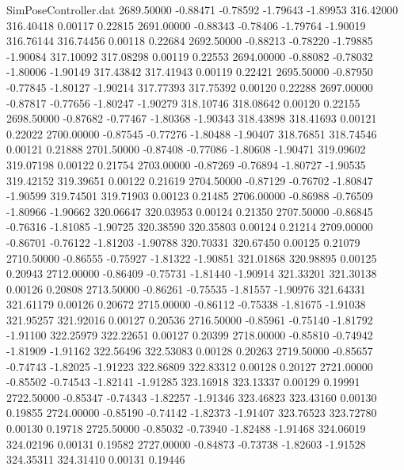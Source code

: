 \begin{filecontents}{SimPoseController.dat}
2689.50000   -0.88471   -0.78592    -1.79643   -1.89953  316.42000  316.40418    0.00117    0.22815
2691.00000   -0.88343   -0.78406    -1.79764   -1.90019  316.76144  316.74456    0.00118    0.22684
2692.50000   -0.88213   -0.78220    -1.79885   -1.90084  317.10092  317.08298    0.00119    0.22553
2694.00000   -0.88082   -0.78032    -1.80006   -1.90149  317.43842  317.41943    0.00119    0.22421
2695.50000   -0.87950   -0.77845    -1.80127   -1.90214  317.77393  317.75392    0.00120    0.22288
2697.00000   -0.87817   -0.77656    -1.80247   -1.90279  318.10746  318.08642    0.00120    0.22155
2698.50000   -0.87682   -0.77467    -1.80368   -1.90343  318.43898  318.41693    0.00121    0.22022
2700.00000   -0.87545   -0.77276    -1.80488   -1.90407  318.76851  318.74546    0.00121    0.21888
2701.50000   -0.87408   -0.77086    -1.80608   -1.90471  319.09602  319.07198    0.00122    0.21754
2703.00000   -0.87269   -0.76894    -1.80727   -1.90535  319.42152  319.39651    0.00122    0.21619
2704.50000   -0.87129   -0.76702    -1.80847   -1.90599  319.74501  319.71903    0.00123    0.21485
2706.00000   -0.86988   -0.76509    -1.80966   -1.90662  320.06647  320.03953    0.00124    0.21350
2707.50000   -0.86845   -0.76316    -1.81085   -1.90725  320.38590  320.35803    0.00124    0.21214
2709.00000   -0.86701   -0.76122    -1.81203   -1.90788  320.70331  320.67450    0.00125    0.21079
2710.50000   -0.86555   -0.75927    -1.81322   -1.90851  321.01868  320.98895    0.00125    0.20943
2712.00000   -0.86409   -0.75731    -1.81440   -1.90914  321.33201  321.30138    0.00126    0.20808
2713.50000   -0.86261   -0.75535    -1.81557   -1.90976  321.64331  321.61179    0.00126    0.20672
2715.00000   -0.86112   -0.75338    -1.81675   -1.91038  321.95257  321.92016    0.00127    0.20536
2716.50000   -0.85961   -0.75140    -1.81792   -1.91100  322.25979  322.22651    0.00127    0.20399
2718.00000   -0.85810   -0.74942    -1.81909   -1.91162  322.56496  322.53083    0.00128    0.20263
2719.50000   -0.85657   -0.74743    -1.82025   -1.91223  322.86809  322.83312    0.00128    0.20127
2721.00000   -0.85502   -0.74543    -1.82141   -1.91285  323.16918  323.13337    0.00129    0.19991
2722.50000   -0.85347   -0.74343    -1.82257   -1.91346  323.46823  323.43160    0.00130    0.19855
2724.00000   -0.85190   -0.74142    -1.82373   -1.91407  323.76523  323.72780    0.00130    0.19718
2725.50000   -0.85032   -0.73940    -1.82488   -1.91468  324.06019  324.02196    0.00131    0.19582
2727.00000   -0.84873   -0.73738    -1.82603   -1.91528  324.35311  324.31410    0.00131    0.19446

\end{filecontents}
